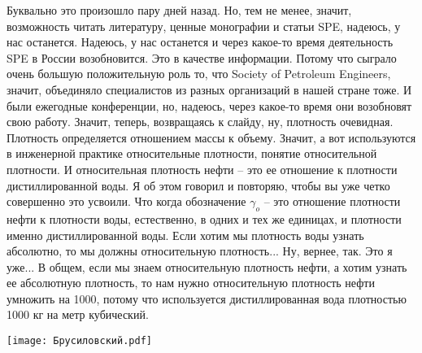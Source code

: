 \documentclass[main.tex]{subfiles}
\begin{document}
Буквально это произошло пару дней назад.
Но, тем не менее, значит, возможность читать литературу, ценные монографии и статьи SPE, надеюсь, у нас останется.
Надеюсь, у нас останется и через какое-то время деятельность SPE в России возобновится.
Это в качестве информации.
Потому что сыграло очень большую положительную роль то, что Society of Petroleum Engineers, значит, объединяло специалистов из разных организаций в нашей стране тоже.
И были ежегодные конференции, но, надеюсь, через какое-то время они возобновят свою работу.
Значит, теперь, возвращаясь к слайду, ну, плотность очевидная.
Плотность определяется отношением массы к объему.
Значит, а вот используются в инженерной практике относительные плотности, понятие относительной плотности.
И относительная плотность нефти -- это ее отношение к плотности дистиллированной воды.
Я об этом говорил и повторяю, чтобы вы уже четко совершенно это усвоили.
Что когда обозначение $\gamma_o$ -- это отношение плотности нефти к плотности воды, естественно, в одних и тех же единицах, и плотности именно дистиллированной воды.
Если хотим мы плотность воды узнать абсолютно, то мы должны относительную плотность...
Ну, вернее, так.
Это я уже...
В общем, если мы знаем относительную плотность нефти, а хотим узнать ее абсолютную плотность, то нам нужно относительную плотность нефти умножить на 1000, потому что используется дистиллированная вода плотностью 1000 кг на метр кубический.

\begin{center}
\texttt{[image: Брусиловский.pdf]}
\end{center}
\end{document}
